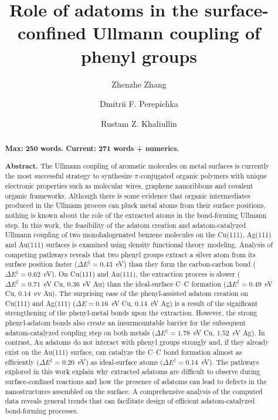 \documentclass[aps,prb,amsmath,amssymb,11pt]{revtex4-1}
\newcommand{\comm}{\color{purple}} %
\begin{document}
\title
{Role of adatoms in the surface-confined Ullmann coupling of phenyl groups}

\author{Zhenzhe Zhang}
\author{Dmitrii F. Perepichka}%
\author{Rustam Z. Khaliullin}
%


\begin{abstract}
\textbf{Max: 250 words. Current: 271 words + numerics.}

\textbf{Abstract.} The Ullmann coupling of aromatic molecules on metal surfaces is currently the most successful strategy to synthesize $\pi$-conjugated organic polymers with unique electronic properties such as molecular wires, graphene nanoribbons and covalent organic frameworks. 
Although there is {\comm some} evidence that organic intermediates produced in the Ullmann process can {\comm pluck} metal atoms from their surface positions, nothing is known about the role of the extracted atoms in the bond-forming {\comm Ullmann} step.
In this work, the feasibility of the adatom creation and adatom-catalyzed Ullmann coupling of two monohalogenated benzene molecules on the Cu(111), Ag(111) and Au(111) surfaces is examined using density functional theory modeling. Analysis of competing pathways reveals that two phenyl groups extract a silver atom from its surface position faster {\comm ($\Delta E^{\ddagger} = 0.43$~eV)} than they form the carbon-carbon bond {\comm ($\Delta E^{\ddagger} = 0.62$~eV)}. On Cu(111) and Au(111), the extraction process is slower {\comm ($\Delta E^{\ddagger} = 0.71$~eV Cu, $0.36$~eV Au)} than the ideal-surface C--C formation {\comm ($\Delta E^{\ddagger} = 0.49$~eV Cu, $0.14$~ev Au)}. The surprising ease of the phenyl-assisted adatom creation on Cu(111) and Ag(111) {\comm ($\Delta E = 0.16$~eV Cu, $0.14$~eV Ag)} is a result of the significant strengthening of the phenyl-metal bonds upon the extraction. However, the strong phenyl-adatom bonds also create an insurmountable barrier for the subsequent adatom-catalyzed coupling step on both metals {\comm ($\Delta E^{\ddagger} = 1.78$~eV Cu, $1.52$~eV Ag)}.
In contrast, Au adatoms do not interact with phenyl groups strongly and, if they already exist on the Au(111) surface, can catalyze the C--C bond formation almost as efficiently {\comm ($\Delta E^{\ddagger} = 0.20$~eV)} as ideal-surface atoms {\comm ($\Delta E^{\ddagger} = 0.14$~eV)}.
The pathways explored in this work explain why extracted adatoms are difficult to observe during surface-confined reactions and how the presence of adatoms can lead to defects in the nanostructures assembled on the surface. 
A comprehensive analysis of the computed data reveals general trends that can facilitate design of efficient adatom-catalyzed bond-forming processes.
\end{abstract}
\end{document}
